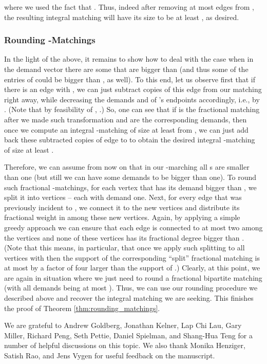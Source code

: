\documentclass[11pt, letterpaper]{article}
\begin{document}
where we used the fact that . Thus, indeed after removing at most  edges from , the resulting integral matching  will have its size  to be at least , as desired.



\subsubsection*{Rounding -Matchings}

In the light of the above, it remains to show how to deal with the case when in the demand vector  there are some  that are bigger than  (and thus some of the entries of  could be bigger than , as well). To this end, let us observe first that if there is an edge  with , we can just subtract  copies of this edge from our matching right away, while decreasing the demands  and  of 's endpoints accordingly, i.e., by . (Note that by feasibility of , .) So, one can see that if  is the fractional matching  after we made such transformation and  are the corresponding demands, then once we compute an integral -matching  of size at least  from , we can just add back these subtracted  copies of edge  to  to obtain the desired integral -matching  of size at least . 

Therefore, we can assume from now on that in our -marching  all s are smaller than one (but still we can have some demands  to be bigger than one). To round such fractional -matchings, for each vertex  that has its demand  bigger than , we split it into  vertices  -- each with demand one. Next, for every edge  that was previously incident to , we connect it to the new vertices and distribute its fractional weight  in  among these new vertices. Again, by applying a simple greedy approach we can ensure that each edge is connected to at most two among the vertices  and none of these vertices has its fractional degree bigger than . (Note that this means, in particular, that once we apply such splitting to all vertices with  then the support of the corresponding ``split'' fractional matching is at most by a factor of four larger than the support of .) Clearly, at this point, we are again in situation where we just need to round a fractional bipartite matching (with all demands being at most ). Thus, we can use our rounding procedure we described above and recover the integral matching we are seeking. This finishes the proof of Theorem \ref{thm:rounding_matchings}.
 \vspace{10pt}

 We are grateful to Andrew Goldberg, Jonathan Kelner, Lap Chi Lau, Gary Miller, Richard Peng, Seth Pettie, Daniel Spielman, and Shang-Hua Teng for a number of helpful discussions on this topic. We also thank Monika Henziger, Satish Rao, and Jens Vygen for useful feedback on the manuscript.  

\appendix
\end{document}
